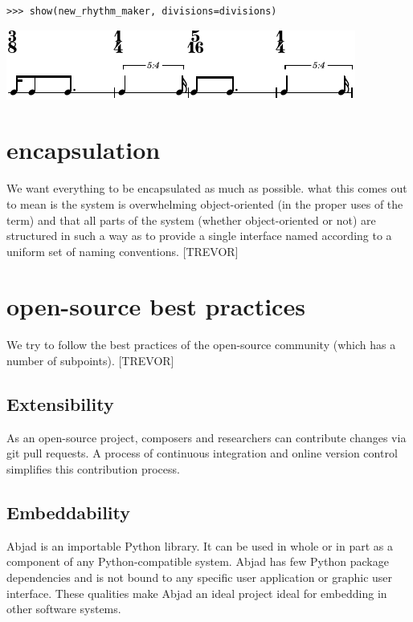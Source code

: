 \documentclass{article}
\begin{document}
\begin{lstlisting}
>>> show(new_rhythm_maker, divisions=divisions)
\end{lstlisting}

\includegraphics[scale=1.0]{images/abjad-9.pdf}


\section{encapsulation}

We want everything to be encapsulated as much as possible. what this comes out
to mean is the system is overwhelming object-oriented (in the proper uses of
the term) and that all parts of the system (whether object-oriented or not) are
structured in such a way as to provide a single interface named according to a
uniform set of naming conventions. [TREVOR]

\section{open-source best practices}

We try to follow the best practices of the open-source community (which has a
number of subpoints). [TREVOR]

\subsection{Extensibility}

As an open-source project, composers and researchers can contribute changes via
git pull requests. A process of continuous integration and online version
control simplifies this contribution process. 

\subsection{Embeddability}

Abjad is an importable Python library. It can be used in whole or in part as a
component of any Python-compatible system. Abjad has few Python package
dependencies and is not bound to any specific user application or graphic user
interface. These qualities make Abjad an ideal project ideal for embedding in
other software systems.
\end{document}
